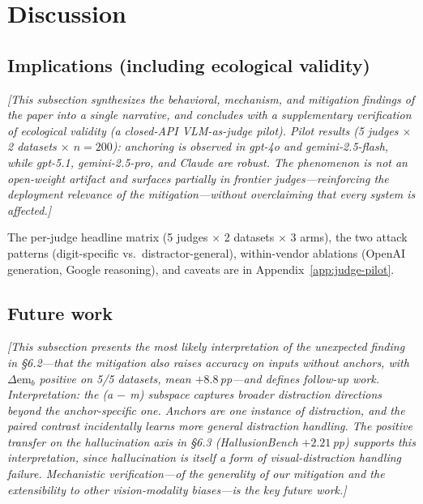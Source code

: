 \documentclass[11pt]{article}
\newcommand{\todoNote}[1]{\textit{\textcolor[rgb]{0.45,0.45,0.45}{[#1]}}}
\begin{document}
\section{Discussion}

\subsection{Implications (including ecological validity)}
\todoNote{This subsection synthesizes the behavioral, mechanism, and mitigation findings of the paper into a \textit{single narrative}, and concludes with a supplementary verification of \textit{ecological validity} (a closed-API VLM-as-judge pilot). Pilot results (5 judges $\times$ 2 datasets $\times$ $n=200$): anchoring is observed in gpt-4o and gemini-2.5-flash, while gpt-5.1, gemini-2.5-pro, and Claude are robust. The phenomenon is not an open-weight artifact and surfaces partially in frontier judges---reinforcing the deployment relevance of the mitigation---without overclaiming that \textit{every} system is affected.}

The per-judge headline matrix (5 judges $\times$ 2 datasets $\times$ 3 arms), the two attack patterns (digit-specific vs.\ distractor-general), within-vendor ablations (OpenAI generation, Google reasoning), and caveats are in Appendix~\ref{app:judge-pilot}.

\subsection{Future work}
\todoNote{This subsection presents the most likely interpretation of the \textit{unexpected finding} in \S6.2---that the mitigation also raises accuracy on inputs without anchors, with $\Delta \mathrm{em}_b$ positive on 5/5 datasets, mean $+8.8$\,pp---and defines follow-up work. Interpretation: the (a $-$ m) subspace captures \textit{broader distraction directions beyond the anchor-specific one}. Anchors are one instance of distraction, and the paired contrast incidentally learns more general distraction handling. The positive transfer on the hallucination axis in \S6.3 (HallusionBench $+2.21$\,pp) supports this interpretation, since hallucination is itself a form of \textit{visual-distraction handling failure}. Mechanistic verification---of the generality of our mitigation and the extensibility to other vision-modality biases---is the key future work.}

\end{document}
